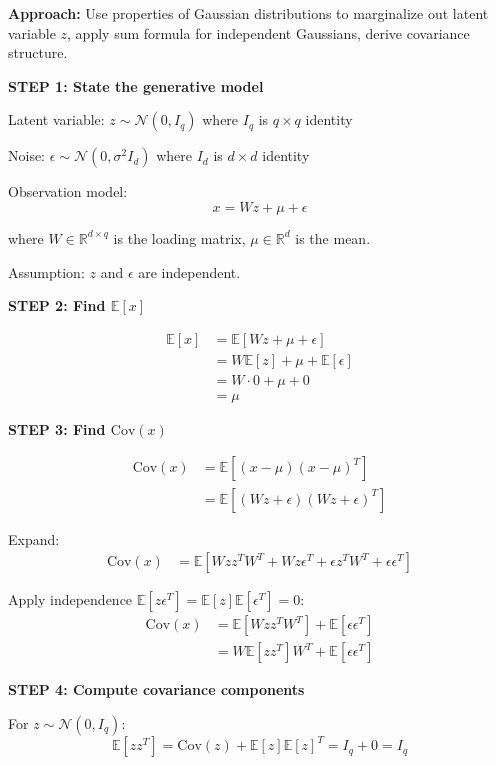 \documentclass[12pt]{article}
\begin{document}
\begin{solution}

\textbf{Approach:} Use properties of Gaussian distributions to marginalize out latent variable $z$, apply sum formula for independent Gaussians, derive covariance structure.

\textbf{STEP 1: State the generative model}

Latent variable: $z \sim \mathcal{N}(0, I_q)$ where $I_q$ is $q \times q$ identity

Noise: $\epsilon \sim \mathcal{N}(0, \sigma^2 I_d)$ where $I_d$ is $d \times d$ identity

Observation model:
\[
x = Wz + \mu + \epsilon
\]

where $W \in \mathbb{R}^{d \times q}$ is the loading matrix, $\mu \in \mathbb{R}^d$ is the mean.

Assumption: $z$ and $\epsilon$ are independent.

\textbf{STEP 2: Find $\mathbb{E}[x]$}

\begin{align*}
\mathbb{E}[x] &= \mathbb{E}[Wz + \mu + \epsilon] \\
&= W\mathbb{E}[z] + \mu + \mathbb{E}[\epsilon] \\
&= W \cdot 0 + \mu + 0 \\
&= \mu
\end{align*}

\textbf{STEP 3: Find $\text{Cov}(x)$}

\begin{align*}
\text{Cov}(x) &= \mathbb{E}[(x - \mu)(x - \mu)^T] \\
&= \mathbb{E}[(Wz + \epsilon)(Wz + \epsilon)^T]
\end{align*}

Expand:
\begin{align*}
\text{Cov}(x) &= \mathbb{E}[Wzz^TW^T + Wz\epsilon^T + \epsilon z^TW^T + \epsilon\epsilon^T]
\end{align*}

Apply independence $\mathbb{E}[z\epsilon^T] = \mathbb{E}[z]\mathbb{E}[\epsilon^T] = 0$:
\begin{align*}
\text{Cov}(x) &= \mathbb{E}[Wzz^TW^T] + \mathbb{E}[\epsilon\epsilon^T] \\
&= W\mathbb{E}[zz^T]W^T + \mathbb{E}[\epsilon\epsilon^T]
\end{align*}

\textbf{STEP 4: Compute covariance components}

For $z \sim \mathcal{N}(0, I_q)$:
\[
\mathbb{E}[zz^T] = \text{Cov}(z) + \mathbb{E}[z]\mathbb{E}[z]^T = I_q + 0 = I_q
\]


\end{solution}
\end{document}
